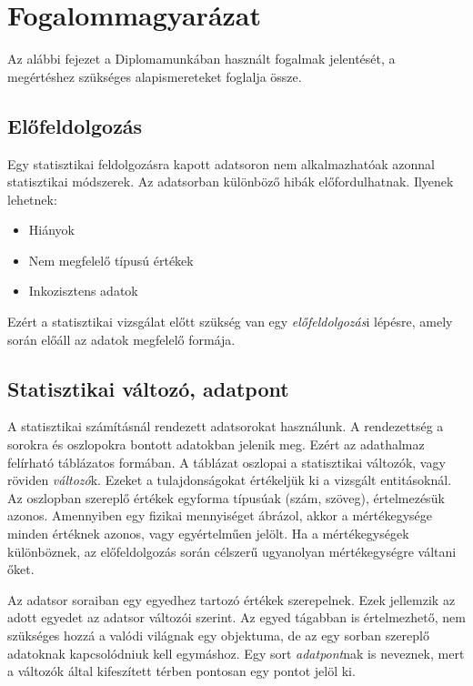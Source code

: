 \chapter{Fogalommagyarázat}

Az alábbi fejezet a Diplomamunkában használt fogalmak jelentését, a megértéshez szükséges alapismereteket foglalja össze.

\section{Előfeldolgozás}
Egy statisztikai feldolgozásra kapott adatsoron nem alkalmazhatóak azonnal statisztikai módszerek. Az adatsorban különböző hibák előfordulhatnak. Ilyenek lehetnek:
\begin{itemize}
    \item Hiányok
    \item Nem megfelelő típusú értékek
    \item Inkozisztens adatok
\end{itemize}
Ezért a statisztikai vizsgálat előtt szükség van egy \emph{előfeldolgozás}i lépésre, amely során előáll az adatok megfelelő formája.

\section{Statisztikai változó, adatpont}
A statisztikai számításnál rendezett adatsorokat használunk. A rendezettség a sorokra és oszlopokra bontott adatokban jelenik meg. Ezért az adathalmaz felírható táblázatos formában. A táblázat oszlopai a statisztikai változók, vagy röviden \emph{változó}k. Ezeket a tulajdonságokat értékeljük ki a vizsgált entitásoknál. Az oszlopban szereplő értékek egyforma típusúak (szám, szöveg), értelmezésük azonos. Amennyiben egy fizikai mennyiséget ábrázol, akkor a mértékegysége minden értéknek azonos, vagy egyértelműen jelölt. Ha a mértékegységek különböznek, az előfeldolgozás során célszerű ugyanolyan mértékegységre váltani őket.

Az adatsor soraiban egy egyedhez tartozó értékek szerepelnek. Ezek jellemzik az adott egyedet az adatsor változói szerint. Az egyed tágabban is értelmezhető, nem szükséges hozzá a valódi világnak egy objektuma, de az egy sorban szereplő adatoknak kapcsolódniuk kell egymáshoz. Egy sort \emph{adatpont}nak is neveznek, mert a változók által kifeszített térben pontosan egy pontot jelöl ki.


